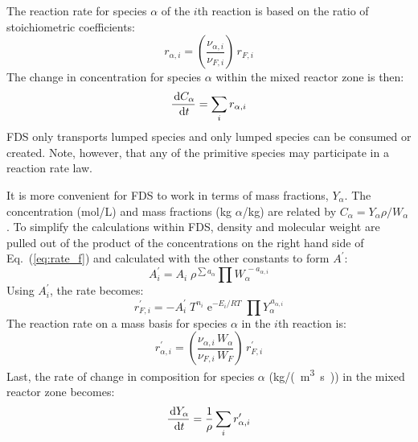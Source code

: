 The reaction rate for species $\alpha$ of the $i$th reaction is based on the ratio of stoichiometric coefficients:
\begin{equation}\label{eq:rate_a}
r_{\alpha,i}= \left(\frac{\nu_{\alpha,i}}{\nu_{F,i}}\right)\,r_{\si{F},i}
\end{equation}
The change in concentration for species $\alpha$ within the mixed reactor zone is then:
\begin{equation}\label{rate_expression}
\frac{\,\mathrm{d} C_{\alpha}}{\,\mathrm{d} t} = \sum_{i} r_{\alpha,i}
\end{equation}
FDS only transports lumped species and only lumped species can be consumed or created.  Note, however, that any of the primitive species may participate in a reaction rate law.

It is more convenient for FDS to work in terms of mass fractions, $Y_{\alpha}$.  The concentration (mol/L) and mass fractions (kg $\alpha$/kg) are related by $C_{\alpha}=Y_{\alpha} \rho/W_{\alpha}$.
To simplify the calculations within FDS, density and molecular weight are pulled out of the product of the concentrations on the right hand side of Eq.~(\ref{eq:rate_f}) and calculated with the other constants to form $A^{\prime}$:
\begin{equation}\label{eq:aprime}
A^{\prime}_{i} = A_{i}\;\rho^{\sum a_{\alpha}}\prod W_{\alpha}^{\,-a_{\alpha,i}}
\end{equation}
Using $A_i^{\prime}$, the rate becomes:
\begin{equation}\label{eq:finite_rate_fin}
r^{\prime}_{F,i} = -A_i^{\prime}\;T^{n_i}\;\mathrm{e}^{-E_i/RT}\;\prod Y_{\alpha}^{\,a_{\alpha,i}}
\end{equation}
The reaction rate on a mass basis for species $\alpha$ in the $i$th reaction is:
\begin{equation}\label{eq:rate_a_y}
r^{\prime}_{\alpha,i}= \left(\frac{\nu_{\alpha,i}\,W_{\alpha}}{\nu_{F,i}\,W_{F}}\right)\,r^{\prime}_{F,i}
\end{equation}
Last, the rate of change in composition for species $\alpha$ (\si{kg/(m^3.s)}) in the mixed reactor zone becomes:
\begin{equation}\label{rate_expression_y}
\frac{\,\mathrm{d} Y_{\alpha}}{\,\mathrm{d} t} = \frac{1}{\rho}\sum_{i} r^{\prime}_{\alpha,i}
\end{equation}



